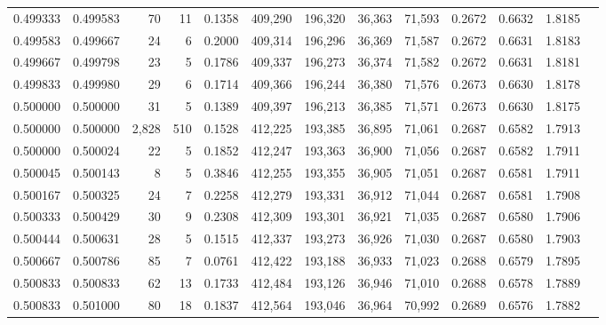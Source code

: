 \begin{tabular}{rrrrrrrrrrrrr}
0.499333 & 0.499583 &    70 &  11 &                                     0.1358 & 409,290 & 196,320 &  36,363 &  71,593 & 0.2672 & 0.6632 & 1.8185 \\
0.499583 & 0.499667 &    24 &   6 &                                     0.2000 & 409,314 & 196,296 &  36,369 &  71,587 & 0.2672 & 0.6631 & 1.8183 \\
0.499667 & 0.499798 &    23 &   5 &                                     0.1786 & 409,337 & 196,273 &  36,374 &  71,582 & 0.2672 & 0.6631 & 1.8181 \\
0.499833 & 0.499980 &    29 &   6 &                                     0.1714 & 409,366 & 196,244 &  36,380 &  71,576 & 0.2673 & 0.6630 & 1.8178 \\
0.500000 & 0.500000 &    31 &   5 &                                     0.1389 & 409,397 & 196,213 &  36,385 &  71,571 & 0.2673 & 0.6630 & 1.8175 \\
0.500000 & 0.500000 & 2,828 & 510 &                                     0.1528 & 412,225 & 193,385 &  36,895 &  71,061 & 0.2687 & 0.6582 & 1.7913 \\
0.500000 & 0.500024 &    22 &   5 &                                     0.1852 & 412,247 & 193,363 &  36,900 &  71,056 & 0.2687 & 0.6582 & 1.7911 \\
0.500045 & 0.500143 &     8 &   5 &                                     0.3846 & 412,255 & 193,355 &  36,905 &  71,051 & 0.2687 & 0.6581 & 1.7911 \\
0.500167 & 0.500325 &    24 &   7 &                                     0.2258 & 412,279 & 193,331 &  36,912 &  71,044 & 0.2687 & 0.6581 & 1.7908 \\
0.500333 & 0.500429 &    30 &   9 &                                     0.2308 & 412,309 & 193,301 &  36,921 &  71,035 & 0.2687 & 0.6580 & 1.7906 \\
0.500444 & 0.500631 &    28 &   5 &                                     0.1515 & 412,337 & 193,273 &  36,926 &  71,030 & 0.2687 & 0.6580 & 1.7903 \\
0.500667 & 0.500786 &    85 &   7 &                                     0.0761 & 412,422 & 193,188 &  36,933 &  71,023 & 0.2688 & 0.6579 & 1.7895 \\
0.500833 & 0.500833 &    62 &  13 &                                     0.1733 & 412,484 & 193,126 &  36,946 &  71,010 & 0.2688 & 0.6578 & 1.7889 \\
0.500833 & 0.501000 &    80 &  18 &                                     0.1837 & 412,564 & 193,046 &  36,964 &  70,992 & 0.2689 & 0.6576 & 1.7882 \\

\end{tabular}
